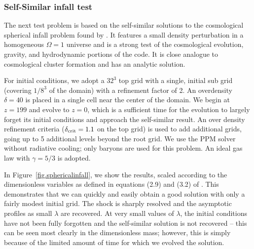 \subsubsection{Self-Similar infall test}
\label{sec.tests.infall}

The next test problem is based on the self-similar solutions to the cosmological spherical infall problem found by \citet{Bertschinger1985}.  It features a small density perturbation in a homogeneous $\Omega = 1$ universe and is a strong test of the cosmological evolution, gravity, and hydrodynamic portions of the code.  It is close analogue to cosmological cluster formation and has an analytic solution.

For initial conditions, we adopt a $32^3$ top grid with a single, initial sub grid (covering $1/8^3$ of the domain) with a refinement factor of 2.  An overdensity $\delta = 40$ is placed in a single cell near the center of the domain.  We begin at $z=199$ and evolve to $z=0$, which is a sufficient time for the evolution to largely forget its initial conditions and approach the self-similar result.  An over density refinement criteria ($\delta_{\rm crit} = 1.1$ on the top grid) is used to add additional grids, going up to 5 additional levels beyond the root grid.  We use the PPM solver without radiative cooling; only baryons are used for this problem.  An ideal gas law with $\gamma = 5/3$ is adopted.

In Figure~\ref{fig.sphericalinfall}, we show the results, scaled according to the dimensionless variables as defined in equations (2.9) and (3.2) of \citet{Bertschinger1985}.  This demonstrates that we can quickly and easily obtain a good solution with only a fairly modest initial grid.  The shock is sharply resolved and the asymptotic profiles as small $\lambda$ are recovered.  At very small values of $\lambda$, the initial conditions have not been fully forgotten and the self-similar solution is not recovered -- this can be seen most clearly in the dimensionless mass; however, this is simply because of the limited amount of time for which we evolved the solution.


